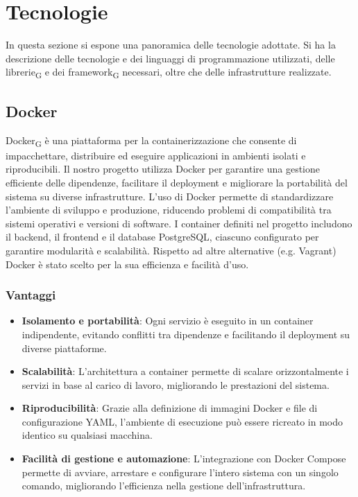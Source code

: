 \section{Tecnologie }
In questa sezione si espone una panoramica delle tecnologie adottate. Si ha la descrizione delle tecnologie e dei linguaggi di programmazione utilizzati, delle librerie\textsubscript{G} e dei framework\textsubscript{G} necessari, oltre che delle infrastrutture realizzate. 
\subsection{Docker}
Docker\textsubscript{G} è una piattaforma per la containerizzazione che consente di impacchettare, distribuire ed eseguire applicazioni in ambienti isolati e riproducibili. Il nostro progetto utilizza Docker per garantire una gestione efficiente delle dipendenze, facilitare il deployment e migliorare la portabilità del sistema su diverse infrastrutture.
L’uso di Docker permette di standardizzare l’ambiente di sviluppo e produzione, riducendo problemi di compatibilità tra sistemi operativi e versioni di software. I container definiti nel progetto includono il backend, il frontend e il database PostgreSQL, ciascuno configurato per garantire modularità e scalabilità. Rispetto ad altre alternative (e.g. Vagrant) Docker è stato scelto per la sua efficienza e facilità d'uso.
\subsubsection{Vantaggi}
\begin{itemize}
    \item \textbf{Isolamento e portabilità}: Ogni servizio è eseguito in un container indipendente, evitando conflitti tra dipendenze e facilitando il deployment su diverse piattaforme.
    \item \textbf{Scalabilità}: L’architettura a container permette di scalare orizzontalmente i servizi in base al carico di lavoro, migliorando le prestazioni del sistema.
    \item \textbf{Riproducibilità}: Grazie alla definizione di immagini Docker e file di configurazione YAML, l’ambiente di esecuzione può essere ricreato in modo identico su qualsiasi macchina.
    \item \textbf{Facilità di gestione e automazione}: L’integrazione con Docker Compose permette di avviare, arrestare e configurare l’intero sistema con un singolo comando, migliorando l’efficienza nella gestione dell’infrastruttura.
\end{itemize}

